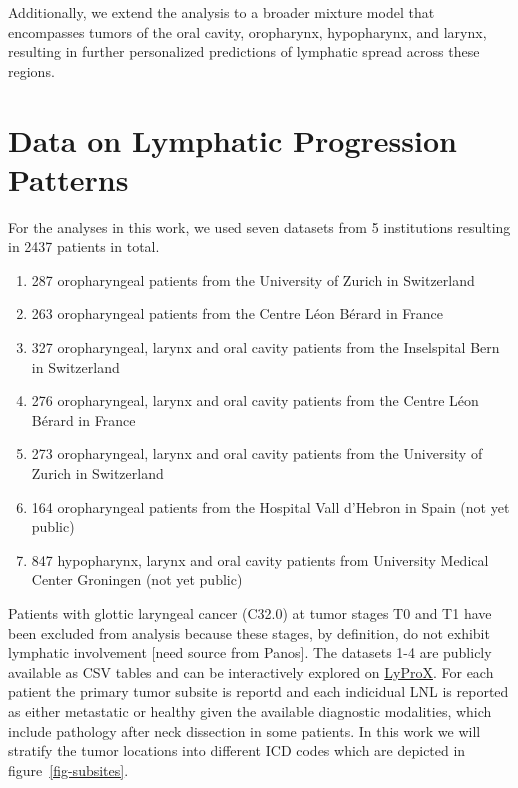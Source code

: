 \documentclass[
  sn-mathphys-num,
]{sn-jnl}
\providecommand{\tightlist}{%
  \setlength{\itemsep}{0pt}\setlength{\parskip}{0pt}}\usepackage{longtable,booktabs,array}
\begin{document}
Additionally, we extend the analysis to a broader mixture model that
encompasses tumors of the oral cavity, oropharynx, hypopharynx, and
larynx, resulting in further personalized predictions of lymphatic
spread across these regions.

\section{Data on Lymphatic Progression Patterns}\label{sec-data}

For the analyses in this work, we used seven datasets from 5
institutions resulting in 2437 patients in total.

\begin{enumerate}
\def\labelenumi{\arabic{enumi}.}
\tightlist
\item
  287 oropharyngeal patients from the University of Zurich in
  Switzerland
\item
  263 oropharyngeal patients from the Centre Léon Bérard in France
\item
  327 oropharyngeal, larynx and oral cavity patients from the
  Inselspital Bern in Switzerland
\item
  276 oropharyngeal, larynx and oral cavity patients from the Centre
  Léon Bérard in France
\item
  273 oropharyngeal, larynx and oral cavity patients from the University
  of Zurich in Switzerland
\item
  164 oropharyngeal patients from the Hospital Vall d'Hebron in Spain
  (not yet public)
\item
  847 hypopharynx, larynx and oral cavity patients from University
  Medical Center Groningen (not yet public)
\end{enumerate}

Patients with glottic laryngeal cancer (C32.0) at tumor stages T0 and T1
have been excluded from analysis because these stages, by definition, do
not exhibit lymphatic involvement {[}need source from Panos{]}. The
datasets 1-4 are publicly available as CSV tables
\citep{ludwig_multi-centric_2023, ludwig_detailed_2022} and can be
interactively explored on \href{https://lyprox.org}{LyProX}. For each
patient the primary tumor subsite is reportd and each indicidual LNL is
reported as either metastatic or healthy given the available diagnostic
modalities, which include pathology after neck dissection in some
patients. In this work we will stratify the tumor locations into
different ICD codes which are depicted in figure~\ref{fig-subsites}.
\end{document}
